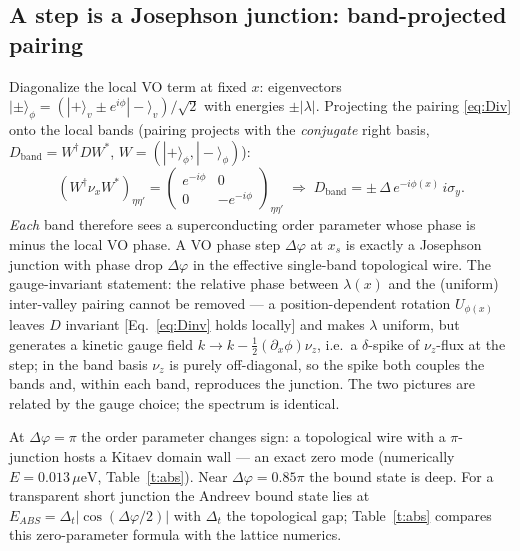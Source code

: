 \documentclass[11pt]{article}
\newcommand{\ueV}{\,\mu\mathrm{eV}}
\newcommand{\nx}{\nu_x}\newcommand{\ny}{\nu_y}\newcommand{\nz}{\nu_z}
\begin{document}
\subsection{A step is a Josephson junction: band-projected pairing}
\label{s:junction}
Diagonalize the local VO term at fixed $x$: eigenvectors
$|\pm\rangle_\phi = (|+\rangle_v \pm e^{i\phi}|-\rangle_v)/\sqrt2$ with
energies $\pm|\lambda|$. Projecting the pairing \eqref{eq:Div} onto the
local bands (pairing projects with the \emph{conjugate} right basis,
$D_{\mathrm{band}} = W^\dagger D W^*$, $W = (|+\rangle_\phi, |-\rangle_\phi)$):
\begin{equation}
\left(W^\dagger \nx W^*\right)_{\eta\eta'} =
\begin{pmatrix} e^{-i\phi} & 0\\ 0 & -e^{-i\phi}\end{pmatrix}_{\eta\eta'}
\;\Longrightarrow\;
D_{\mathrm{band}} = \pm\,\Delta\, e^{-i\phi(x)}\, i\sigma_y .
\label{eq:bandpair}
\end{equation}
\emph{Each} band therefore sees a superconducting order parameter whose
phase is minus the local VO phase. A VO phase step $\Delta\varphi$ at
$x_s$ is exactly a Josephson junction with phase drop $\Delta\varphi$ in
the effective single-band topological wire. The gauge-invariant statement:
the relative phase between $\lambda(x)$ and the (uniform) inter-valley
pairing cannot be removed --- a position-dependent rotation $U_{\phi(x)}$
leaves $D$ invariant [Eq.~\eqref{eq:Dinv} holds locally] and makes
$\lambda$ uniform, but generates a kinetic gauge field
$k \to k - \tfrac12(\partial_x\phi)\nz$, i.e.\ a $\delta$-spike of
$\nz$-flux at the step; in the band basis $\nz$ is purely off-diagonal,
so the spike both couples the bands and, within each band, reproduces the
junction. The two pictures are related by the gauge choice; the spectrum
is identical.

At $\Delta\varphi = \pi$ the order parameter changes sign: a topological
wire with a $\pi$-junction hosts a Kitaev domain wall --- an exact zero
mode (numerically $E = 0.013\ueV$, Table~\ref{t:abs}). Near
$\Delta\varphi = 0.85\pi$ the bound state is deep. For a transparent
short junction the Andreev bound state lies at
$E_{ABS} = \Delta_t|\cos(\Delta\varphi/2)|$ with $\Delta_t$ the
topological gap; Table~\ref{t:abs} compares this zero-parameter formula
with the lattice numerics.
\end{document}
